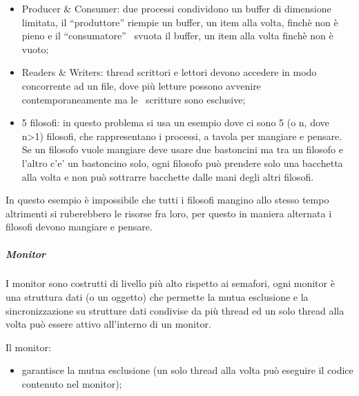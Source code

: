 \documentclass[
]{article}
\providecommand{\tightlist}{%
  \setlength{\itemsep}{0pt}\setlength{\parskip}{0pt}}
\begin{document}
{}

\begin{itemize}
\tightlist
\item
  {Producer \& Consumer: due processi condividono un buffer di
  dimensione limitata, il ``produttore'' riempie un buffer, un item alla
  volta, finchè non è pieno e il ``consumatore'' ~svuota il buffer, un
  item alla volta finchè non è vuoto;}
\end{itemize}

{}

\begin{itemize}
\tightlist
\item
  {Readers \& Writers: thread scrittori e lettori devono accedere in
  modo concorrente ad un file, dove più letture possono avvenire
  contemporaneamente ma le ~scritture sono esclusive;}
\end{itemize}

{}

\begin{itemize}
\tightlist
\item
  {5 filosofi: in questo problema si usa un esempio dove ci sono 5 (o n,
  dove n\textgreater1) filosofi, che rappresentano i processi, a tavola
  per mangiare e pensare. Se un filosofo vuole mangiare deve usare due
  bastoncini ma tra un filosofo e l'altro c'e' un bastoncino solo, ogni
  filosofo può prendere solo una bacchetta alla volta e non può
  sottrarre bacchette dalle mani degli altri filosofi.}
\end{itemize}

{In questo esempio è impossibile che tutti i filosofi mangino allo
stesso tempo altrimenti si ruberebbero le risorse fra loro, per questo
in maniera alternata i filosofi devono mangiare e pensare.}

{}

{}

\subparagraph{\texorpdfstring{{Monitor}}{Monitor}}\label{h.h2rgztrv11jx}

{I monitor sono costrutti di livello più alto rispetto ai semafori, ogni
monitor è una struttura dati (o un oggetto) che permette la mutua
esclusione e la sincronizzazione su strutture dati condivise da più
thread ed un solo thread alla volta può essere attivo all'interno di un
monitor.}

{}

{Il monitor:}

{}

\begin{itemize}
\tightlist
\item
  {garantisce la mutua esclusione (un solo thread alla volta può
  eseguire il codice contenuto nel monitor);}
\end{itemize}
\end{document}
